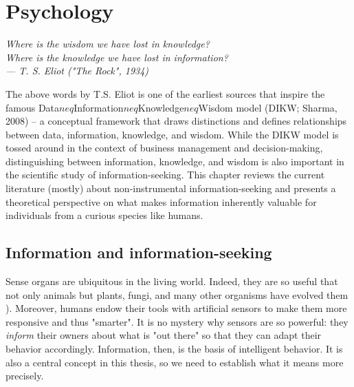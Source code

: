 \chapter{Psychology}\label{ch:psychology}

\begin{flushright}{\slshape
    Where is the wisdom we have lost in knowledge? \\
    Where is the knowledge we have lost in information? \\
    --- T. S. Eliot ("The Rock", 1934)}
\end{flushright}
The above words by T.S. Eliot is one of the earliest sources that inspire the famous Data$neq$Information$neq$Knowledge$neq$Wisdom model (DIKW; Sharma, 2008) -- a conceptual framework that draws distinctions and defines relationships between data, information, knowledge, and wisdom. While the DIKW model is tossed around in the context of business management and decision-making, distinguishing between information, knowledge, and wisdom is also important in the scientific study of information-seeking. This chapter reviews the current literature (mostly) about non-instrumental information-seeking and presents a theoretical perspective on what makes information inherently valuable for individuals from a curious species like humans.

\section{Information and information-seeking}

Sense organs are ubiquitous in the living world. Indeed, they are so useful that not only animals but plants, fungi, and many other organisms have evolved them \cite{trewavas_plant_2005,braunsdorf_fungal_2016,bourret_census_200,schwab_evolution_2018}). Moreover, humans endow their tools with artificial sensors to make them more responsive and thus "smarter". %
It is no mystery why sensors are so powerful: they \emph{inform} their owners about what is "out there" so that they can adapt their behavior accordingly. Information, then, is the basis of intelligent behavior. It is also a central concept in this thesis, so we need to establish what it means more precisely. 


